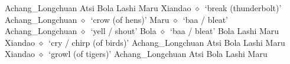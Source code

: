          Achang\_Longchuan 
\hspace{1ex}
         Atsi 
\hspace{1ex}
         Bola 
\hspace{1ex}
         Lashi 
\hspace{1ex}
         Maru 
\hspace{1ex}
         Xiandao 
\hspace{1ex}
         $\diamond$~`break (thunderbolt)'
         Achang\_Longchuan 
\hspace{1ex}
         $\diamond$~`crow (of hens)'
         Maru 
\hspace{1ex}
         $\diamond$~`baa / bleat'
         Achang\_Longchuan 
\hspace{1ex}
         $\diamond$~`yell / shout'
         Bola 
\hspace{1ex}
         $\diamond$~`baa / bleat'
         Bola 
\hspace{1ex}
         Lashi 
\hspace{1ex}
         Maru 
\hspace{1ex}
         Xiandao 
\hspace{1ex}
         $\diamond$~`cry / chirp (of birds)'
         Achang\_Longchuan 
\hspace{1ex}
         Atsi 
\hspace{1ex}
         Bola 
\hspace{1ex}
         Lashi 
\hspace{1ex}
         Maru 
\hspace{1ex}
         Xiandao 
\hspace{1ex}
         $\diamond$~`growl (of tigers)'
         Achang\_Longchuan 
\hspace{1ex}
         Atsi 
\hspace{1ex}
         Bola 
\hspace{1ex}
         Lashi 
\hspace{1ex}
         Maru 
